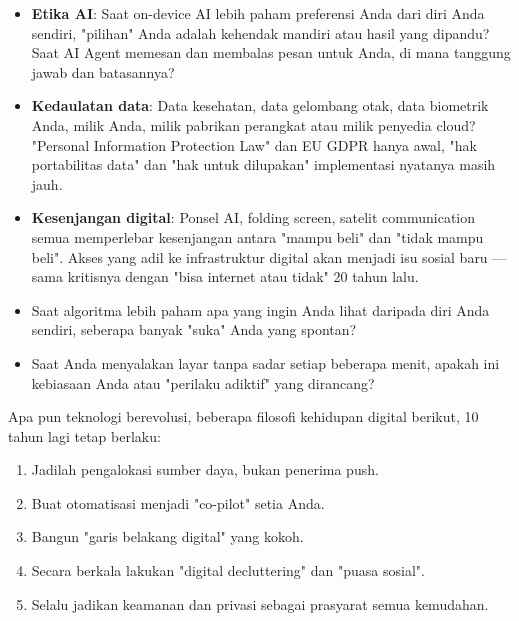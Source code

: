 \begin{itemize}
  \item \textbf{Etika AI}: Saat on-device AI lebih paham preferensi Anda dari diri Anda sendiri, "pilihan" Anda adalah kehendak mandiri atau hasil yang dipandu? Saat AI Agent memesan dan membalas pesan untuk Anda, di mana tanggung jawab dan batasannya?
  \item \textbf{Kedaulatan data}: Data kesehatan, data gelombang otak, data biometrik Anda, milik Anda, milik pabrikan perangkat atau milik penyedia cloud? "Personal Information Protection Law" dan EU GDPR hanya awal, "hak portabilitas data" dan "hak untuk dilupakan" implementasi nyatanya masih jauh.
  \item \textbf{Kesenjangan digital}: Ponsel AI, folding screen, satelit communication semua memperlebar kesenjangan antara "mampu beli" dan "tidak mampu beli". Akses yang adil ke infrastruktur digital akan menjadi isu sosial baru — sama kritisnya dengan "bisa internet atau tidak" 20 tahun lalu.
  \item Saat algoritma lebih paham apa yang ingin Anda lihat daripada diri Anda sendiri, seberapa banyak "suka" Anda yang spontan?
  \item Saat Anda menyalakan layar tanpa sadar setiap beberapa menit, apakah ini kebiasaan Anda atau "perilaku adiktif" yang dirancang?
\end{itemize}


Apa pun teknologi berevolusi, beberapa filosofi kehidupan digital berikut, 10 tahun lagi tetap berlaku:

\begin{enumerate}
  \item Jadilah pengalokasi sumber daya, bukan penerima push.
  \item Buat otomatisasi menjadi "co-pilot" setia Anda.
  \item Bangun "garis belakang digital" yang kokoh.
  \item Secara berkala lakukan "digital decluttering" dan "puasa sosial".
  \item Selalu jadikan keamanan dan privasi sebagai prasyarat semua kemudahan.
\end{enumerate}

